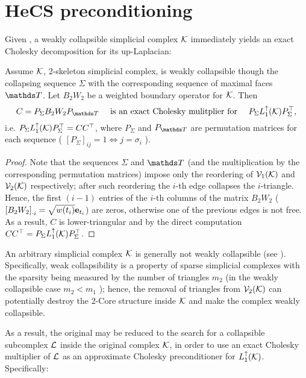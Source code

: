 \section{ HeCS preconditioning }
Given , a weakly collapsible simplicial complex \(\mathcal{K} \) immediately yields an exact Cholesky decomposition for its up-Laplacian:
\begin{lemma}\label{lem:exact}
      Assume \( \mathcal{K} \), 2-skeleton simplicial complex, is weakly collapsible though the collapsing sequence \( \Sigma \) with the corresponding sequence of maximal faces \( \ds T \). Let \( B_2 W_2 \) be a weighted boundary operator for \( \mathcal{K} \). Then 
      \begin{equation*}
            C =  P_\Sigma B_2 W_2 P_{\ds T} \quad \text{ is an exact Cholesky mulitplier for } \quad  P_\Sigma \Lu 1(\mc K) P_\Sigma^\top,
      \end{equation*}
      i.e. \( P_\Sigma L_{1}^{\uparrow} (\mathcal{K}) P_\Sigma^\top = C C^\top \), where \( P_\Sigma \) and \( P_{\ds T} \) are permutation matrices for each sequence ( \( \left[ P_\Sigma \right]_{ij} = 1  \iff j = \sigma_i \) ).
\end{lemma}
\begin{proof}
      Note that the sequences \( \Sigma \) and \( \ds T \) (and the multiplication by the corresponding permutation matrices) impose only the reordering of \( \mathcal{V}_{1}(\mathcal{K}) \) and \( \mathcal{V}_{2}(\mathcal{K})\) respectively; after such reordering the \(i\)-th edge collapses the \(i\)-triangle. Hence, the first \((i-1) \) entries of the \( i \)-th columns of the matrix \( B_2 W_2 \) ( \( \left[ B_2 W_2 \right]_{\cdot i} = \sqrt{w(t_i)} \mathbf{e}_{t_i} \)) are zeros, otherwise one of the previous edges is not free. As a result, \( C \) is lower-triangular and by the direct computation \( C C^\top = P_\Sigma L_{1}^{\uparrow} (\mathcal{K} ) P_\Sigma^\top \).
\end{proof}

An arbitrary simplicial complex \( \mathcal{K} \) is generally not weakly collapsible (see ). Specifically, weak collapsibility is a property of sparse simplicial complexes with the sparsity being measured by the number of triangles \(m_2 \) (in the weakly collapsible case \( m_2 < m_1 \) ); hence, the removal of triangles from \( \mathcal{V}_{2}(\mathcal{K}) \) can potentially destroy the 2-Core structure inside \( \mathcal{K} \) and make the complex weakly collapsible. 

As a result, the original  may be reduced to the search for a collapsible subcomplex \( \mathcal{L} \) inside the original complex \( \mathcal{K} \), in order to use an exact Cholesky multiplier of \( \mathcal{L} \) as an approximate Cholesky preconditioner for \( L_{1}^{\uparrow} ( \mathcal{K} )\). Specifically:

